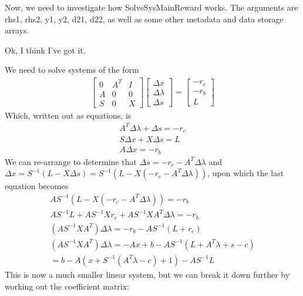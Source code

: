 \documentclass{article}
\begin{document}
Now, we need to investigate how SolveSysMainReward works. The arguments are rhs1, rhs2, y1, y2, d21, d22, as well as some other metadata and data storage arrays. 

Ok, I think I've got it.

We need to solve systems of the form
\begin{align}
		\begin{bmatrix}
				0 & A^T & I\\
				A & 0   & 0\\
				S & 0   & X
		\end{bmatrix}
		\begin{bmatrix}
				\Delta x\\
				\Delta \lambda\\
				\Delta s
		\end{bmatrix} 
		= 
		\begin{bmatrix}
				-r_c\\
				-r_b\\
				L
		\end{bmatrix}
\end{align}
Which, written out as equations, is
\begin{align}
		A^T\Delta \lambda + \Delta s = -r_c\\
		S\Delta x + X\Delta s = L\\
		A\Delta x = -r_b
\end{align}
We can re-arrange to determine that $\Delta s = -r_c - A^T\Delta \lambda$ and $\Delta x = S^{-1}(L - X\Delta s) = S^{-1}(L - X(-r_c - A^T\Delta \lambda))$, upon which the last equation becomes
\begin{align}
		AS^{-1}(L - X(-r_c - A^T\Delta \lambda)) = -r_b\\
		AS^{-1}L + AS^{-1}Xr_c + AS^{-1}XA^T\Delta \lambda = -r_b\\
		(AS^{-1}XA^T) \Delta \lambda = -r_b - AS^{-1}(L + r_c)\\
		(AS^{-1}XA^T) \Delta \lambda = -Ax + b - AS^{-1}(L + A^T\lambda + s - c)\\
		= b - A(x + S^{-1}(A^T\lambda - c) + 1) - AS^{-1}L
\end{align}
This is now a much smaller linear system, but we can break it down further by working out the coefficient matrix:
\end{document}

